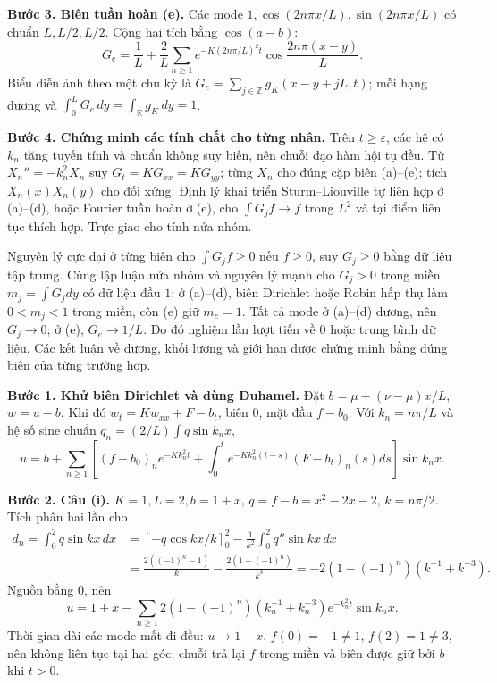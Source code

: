 \textbf{Bước 3. Biên tuần hoàn (e).}
Các mode $1,\cos(2n\pi x/L),\sin(2n\pi x/L)$ có chuẩn $L,L/2,L/2$. Cộng hai tích bằng $\cos(a-b)$:
\[G_e=\frac1L+\frac2L\sum_{n\ge1}e^{-K(2n\pi/L)^2t}\cos\frac{2n\pi(x-y)}L.\]
Biểu diễn ảnh theo một chu kỳ là $G_e=\sum_{j\in\mathbb Z}g_K(x-y+jL,t)$; mỗi hạng dương và $\int_0^LG_e\,dy=\int_{\mathbb R}g_K\,dy=1$.

\textbf{Bước 4. Chứng minh các tính chất cho từng nhân.}
Trên $t\ge\varepsilon$, các hệ có $k_n$ tăng tuyến tính và chuẩn không suy biến, nên chuỗi đạo hàm hội tụ đều. Từ $X_n''=-k_n^2X_n$ suy $G_t=KG_{xx}=KG_{yy}$; từng $X_n$ cho đúng cặp biên (a)--(e); tích $X_n(x)X_n(y)$ cho đối xứng. Định lý khai triển Sturm–Liouville tự liên hợp ở (a)--(d), hoặc Fourier tuần hoàn ở (e), cho $\int G_jf\to f$ trong $L^2$ và tại điểm liên tục thích hợp. Trực giao cho tính nửa nhóm.

Nguyên lý cực đại ở từng biên cho $\int G_jf\ge0$ nếu $f\ge0$, suy $G_j\ge0$ bằng dữ liệu tập trung. Cùng lập luận nửa nhóm và nguyên lý mạnh cho $G_j>0$ trong miền. $m_j=\int G_jdy$ có dữ liệu đầu $1$: ở (a)--(d), biên Dirichlet hoặc Robin hấp thụ làm $0<m_j<1$ trong miền, còn (e) giữ $m_e=1$. Tất cả mode ở (a)--(d) dương, nên $G_j\to0$; ở (e), $G_e\to1/L$. Do đó nghiệm lần lượt tiến về $0$ hoặc trung bình dữ liệu. Các kết luận về dương, khối lượng và giới hạn được chứng minh bằng đúng biên của từng trường hợp.

\textbf{Bước 1. Khử biên Dirichlet và dùng Duhamel.}
Đặt $b=\mu+(\nu-\mu)x/L$, $w=u-b$. Khi đó $w_t=Kw_{xx}+F-b_t$, biên $0$, mặt đầu $f-b_0$. Với $k_n=n\pi/L$ và hệ số sine chuẩn $q_n=(2/L)\int q\sin k_nx$,
\[u=b+\sum_{n\ge1}\left[(f-b_0)_ne^{-Kk_n^2t}
+\int_0^te^{-Kk_n^2(t-s)}(F-b_t)_n(s)ds\right]\sin k_nx.\]

\textbf{Bước 2. Câu (i).} $K=1,L=2,b=1+x$, $q=f-b=x^2-2x-2$, $k=n\pi/2$. Tích phân hai lần cho
\begin{align*}
d_n=\int_0^2q\sin kx\,dx
&=\left[-q\cos kx/k\right]_0^2-\frac1{k^2}\int_0^2q''\sin kx\,dx\\
&=\frac{2((-1)^n-1)}k-\frac{2(1-(-1)^n)}{k^3}
=-2(1-(-1)^n)(k^{-1}+k^{-3}).
\end{align*}
Nguồn bằng $0$, nên
\[u=1+x-\sum_{n\ge1}2(1-(-1)^n)(k_n^{-1}+k_n^{-3})e^{-k_n^2t}\sin k_nx.\]
Thời gian dài các mode mất đi đều: $u\to1+x$. $f(0)=-1\ne1$, $f(2)=1\ne3$, nên không liên tục tại hai góc; chuỗi trả lại $f$ trong miền và biên được giữ bởi $b$ khi $t>0$.


